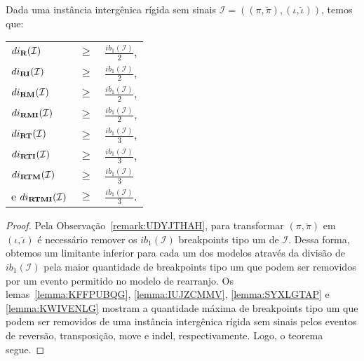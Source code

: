 \begin{theorem}\label{theorem:MPFPKHQO}
Dada uma instância intergênica rígida sem sinais $\mathcal{I} = ((\pi,\breve\pi),(\iota,\breve\iota))$, temos que:

\begin{tabular}{lll}
  $di_{\textbf{R}}(\mathcal{I})$      & $ \ge $ & $\frac{ib_1(\mathcal{I})}{2}$, \\ 
  $di_{\textbf{RI}}(\mathcal{I})$     & $ \ge $ & $\frac{ib_1(\mathcal{I})}{2}$, \\
  $di_{\textbf{RM}}(\mathcal{I})$     & $ \ge $ & $\frac{ib_1(\mathcal{I})}{2}$, \\
  $di_{\textbf{RMI}}(\mathcal{I})$    & $ \ge $ & $\frac{ib_1(\mathcal{I})}{2}$, \\
  $di_{\textbf{RT}}(\mathcal{I})$     & $ \ge $ & $\frac{ib_1(\mathcal{I})}{3}$, \\
  $di_{\textbf{RTI}}(\mathcal{I})$    & $ \ge $ & $\frac{ib_1(\mathcal{I})}{3}$, \\
  $di_{\textbf{RTM}}(\mathcal{I})$    & $ \ge $ & $\frac{ib_1(\mathcal{I})}{3}$  \\
  e $di_{\textbf{RTMI}}(\mathcal{I})$ & $ \ge $ & $\frac{ib_1(\mathcal{I})}{3}$. \\
\end{tabular}
\end{theorem}
\begin{proof}
Pela Observação~\ref{remark:UDYJTHAH}, para transformar $(\pi,\breve\pi)$ em $(\iota,\breve\iota)$ é necessário remover os $ib_1(\mathcal{I})$ breakpoints tipo um de $\mathcal{I}$. Dessa forma, obtemos um limitante inferior para cada um dos modelos através da divisão de $ib_1(\mathcal{I})$ pela maior quantidade de breakpoints tipo um que podem ser removidos por um evento permitido no modelo de rearranjo. Os lemas~\ref{lemma:KFFPUBQG}, \ref{lemma:IUJZCMMV}, \ref{lemma:SYXLGTAP} e \ref{lemma:KWIVENLG} mostram a quantidade máxima de breakpoints tipo um que podem ser removidos de uma instância intergênica rígida sem sinais pelos eventos de reversão, transposição, move e indel, respectivamente. Logo, o teorema segue.
\end{proof}

